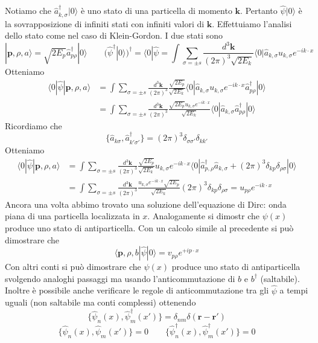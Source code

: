 Notiamo che $\hat{a}_{k,\sigma}^\dagger|0\rangle$ è uno stato di una particella di momento $\mathbf{k}$. Pertanto $\hat{\psi}|0\rangle$ è la sovrapposizione di infiniti stati con infiniti valori di $\mathbf{k}$. Effettuiamo l'analisi dello stato come nel caso di Klein-Gordon. I due stati sono
$$
|\mathbf{p}, \rho, a\rangle = \sqrt{2E_p} \hat{a}_{p\rho}^\dagger |0\rangle \qquad (\hat{\psi}^\dagger |0\rangle)^\dagger = \langle 0 | \hat{\psi} = \int \sum_{\sigma=\pm s} \frac{d^3\mathbf{k}}{(2\pi)^3\sqrt{2E_k}} \langle 0 | \hat{a}_{k,\sigma} u_{k,\sigma} e^{-ik\cdot x}
$$
Otteniamo
\begin{align*}
\langle 0 | \hat{\psi} | \mathbf{p}, \rho, a \rangle &= \int \sum_{\sigma=\pm s} \frac{d^3\mathbf{k}}{(2\pi)^3} \frac{\sqrt{2E_p}}{\sqrt{2E_k}} \langle 0 | \hat{a}_{k,\sigma} u_{k,\sigma} e^{-ik\cdot x} \hat{a}_{p\rho}^\dagger | 0 \rangle \\
&= \int \sum_{\sigma=\pm s} \frac{d^3\mathbf{k}}{(2\pi)^3} \frac{\sqrt{2E_p}u_{k,\sigma} e^{-ik\cdot x}}{\sqrt{2E_k}} \langle 0 | \hat{a}_{k,\sigma} \hat{a}_{p\rho}^\dagger | 0 \rangle
\end{align*}
Ricordiamo che
$$
\{\hat{a}_{k\sigma}, \hat{a}_{k'\sigma'}^\dagger\} = (2\pi)^3 \delta_{\sigma\sigma'}\delta_{kk'}
$$
Otteniamo
\begin{align*}
\langle 0 | \hat{\psi} | \mathbf{p}, \rho, a \rangle &= \int \sum_{\sigma=\pm s} \frac{d^3\mathbf{k}}{(2\pi)^3} \frac{\sqrt{2E_p}}{\sqrt{2E_k}} u_{k,\sigma} e^{-ik\cdot x} \langle 0 | \hat{a}_{p,\rho}^\dagger \hat{a}_{k,\sigma} + (2\pi)^3 \delta_{kp} \delta_{\rho\sigma} | 0 \rangle \\
&= \int \sum_{\sigma=\pm s} \frac{d^3\mathbf{k}}{(2\pi)^3} \frac{u_{k,\sigma} e^{-ik\cdot x} \sqrt{2E_p}}{\sqrt{2E_k}} (2\pi)^3 \delta_{kp} \delta_{\rho\sigma} = u_{p\rho} e^{-ik\cdot x}
\end{align*}
Ancora una volta abbimo trovato una soluzione dell'equazione di Dirc: onda piana di una particella localizzata in $x$. Analogamente si dimostr che $\psi(x)$ produce uno stato di antiparticella. Con un calcolo simile al precedente si può dimostrare che
$$
\langle \mathbf{p}, \rho, b | \hat{\psi} | 0 \rangle = v_{p\rho} e^{+ip\cdot x}
$$
Con altri conti si può dimostrare che $\psi(x)$ produce uno stato di antiparticella svolgendo analoghi passaggi ma usando l'anticommutazione di $b$ e $b^\dagger$ (saltabile). Inoltre è possibile anche verificare le regole di anticommutazione tra gli $\hat{\psi}$ a tempi uguali (non saltabile ma conti complessi) ottenendo 
$$
\{\hat{\psi}_n(x), \hat{\psi}_m^\dagger(x')\} = \delta_{nm} \delta(\mathbf{r} - \mathbf{r}')
$$
$$
\{\hat{\psi}_n(x), \hat{\psi}_m(x')\} = 0 \qquad \{\hat{\psi}_n^\dagger(x), \hat{\psi}_m^\dagger(x')\} = 0
$$

